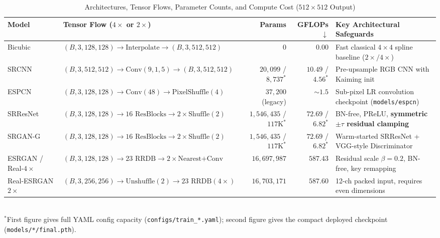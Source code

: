 \documentclass[10pt,onecolumn,journal]{IEEEtran}
\begin{document}
\begin{table}[t]
\centering
\caption{Architectures, Tensor Flows, Parameter Counts, and Compute Cost ($512\times512$ Output)}
\label{tab:arch}
\footnotesize
\begin{tabular}{@{}llrrl@{}}
\toprule
\textbf{Model} & \textbf{Tensor Flow ($4\times$ or $2\times$)} & \textbf{Params} & \textbf{GFLOPs} $\downarrow$ & \textbf{Key Architectural Safeguards} \\
\midrule
Bicubic~\cite{keys1981cubic} & $(B,3,128,128) \to \text{Interpolate} \to (B,3,512,512)$ & $0$ & $0.00$ & Fast classical $4\times4$ spline baseline ($2\times/4\times$) \\
SRCNN~\cite{dong2016srcnn} & $(B,3,512,512) \to \text{Conv}(9,1,5) \to (B,3,512,512)$ & $20{,}099$ / $8{,}737^*$ & $10.49$ / $4.56^*$ & Pre-upsample RGB CNN with Kaiming init \\
ESPCN~\cite{shi2016espcn} & $(B,3,128,128) \to \text{Conv}(48) \to \text{PixelShuffle}(4)$ & $37{,}200$ (legacy) & $\sim1.5$ & Sub-pixel LR convolution checkpoint (\texttt{models/espcn}) \\
SRResNet~\cite{ledig2017srgan} & $(B,3,128,128) \to 16\text{ ResBlocks} \to 2\times \text{Shuffle}(2)$ & $1{,}546{,}435$ / $117\text{K}^*$ & $72.69$ / $6.82^*$ & BN-free, PReLU, \textbf{symmetric $\pm\tau$ residual clamping} \\
SRGAN-G~\cite{ledig2017srgan} & $(B,3,128,128) \to 16\text{ ResBlocks} \to 2\times \text{Shuffle}(2)$ & $1{,}546{,}435$ / $117\text{K}^*$ & $72.69$ / $6.82^*$ & Warm-started SRResNet + VGG-style Discriminator \\
ESRGAN / Real-$4\times$~\cite{wang2018esrgan,wang2021realesrgan} & $(B,3,128,128) \to 23\text{ RRDB} \to 2\times \text{Nearest+Conv}$ & $16{,}697{,}987$ & $587.43$ & Residual scale $\beta=0.2$, BN-free, key remapping \\
Real-ESRGAN $2\times$~\cite{wang2021realesrgan} & $(B,3,256,256) \to \text{Unshuffle}(2) \to 23\text{ RRDB}(4\times)$ & $16{,}703{,}171$ & $587.60$ & 12-ch packed input, requires even dimensions \\
\bottomrule
\end{tabular}
\\[2pt]
\footnotesize $^*$First figure gives full YAML config capacity (\texttt{configs/train\_*.yaml}); second figure gives the compact deployed checkpoint (\texttt{models/*/final.pth}).
\end{table}
\end{document}
